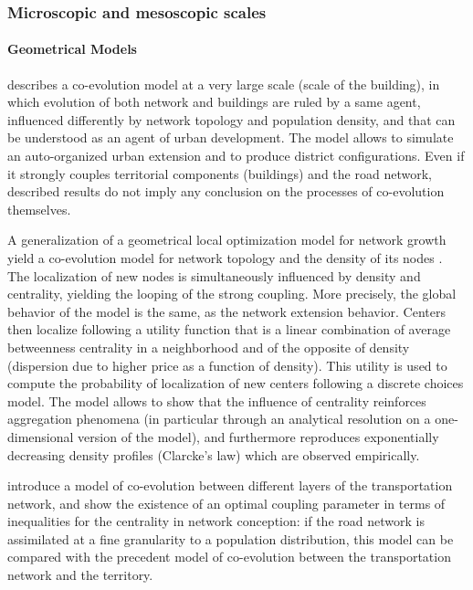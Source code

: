 \subsubsection{Microscopic and mesoscopic scales}


\paragraph{Geometrical Models}

\cite{achibet2014model} describes a co-evolution model at a very large scale (scale of the building), in which evolution of both network and buildings are ruled by a same agent, influenced differently by network topology and population density, and that can be understood as an agent of urban development. The model allows to simulate an auto-organized urban extension and to produce district configurations. Even if it strongly couples territorial components (buildings) and the road network, described results do not imply any conclusion on the processes of co-evolution themselves.

A generalization of a geometrical local optimization model for network growth yield a co-evolution model for network topology and the density of its nodes \citep{barthelemy2009co}. The localization of new nodes is simultaneously influenced by density and centrality, yielding the looping of the strong coupling. More precisely, the global behavior of the model is the same, as the network extension behavior. Centers then localize following a utility function that is a linear combination of average betweenness centrality in a neighborhood and of the opposite of density (dispersion due to higher price as a function of density). This utility is used to compute the probability of localization of new centers following a discrete choices model. The model allows to show that the influence of centrality reinforces aggregation phenomena (in particular through an analytical resolution on a one-dimensional version of the model), and furthermore reproduces exponentially decreasing density profiles (Clarcke's law) which are observed empirically.  


\cite{ding2017heuristic} introduce a model of co-evolution between different layers of the transportation network, and show the existence of an optimal coupling parameter in terms of inequalities for the centrality in network conception: if the road network is assimilated at a fine granularity to a population distribution, this model can be compared with the precedent model of co-evolution between the transportation network and the territory.




